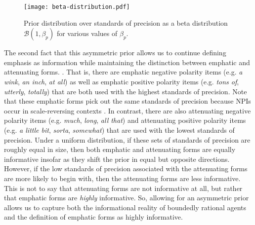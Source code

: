 \documentclass[linguex]{sp}
\theoremstyle{definition} \newtheorem{definition}{Definition}
\begin{document}
\begin{figure}
\begin{center}
	\texttt{[image: beta-distribution.pdf]}
	\caption{Prior distribution over standards of precision as a beta distribution $\mathcal{B}(1, \beta_p)$ for various values of $\beta_p$.}
	\label{beta}
\end{center}
\end{figure}


The second fact that this asymmetric prior allows us to continue defining emphasis as information while maintaining the distinction between emphatic and attenuating forms.  \citep{israel2011}. That is, there are emphatic negative polarity items (e.g. \emph{a wink}, \emph{an inch}, \emph{at all}) as well as emphatic positive polarity items (e.g. \emph{tons of}, \emph{utterly}, \emph{totally}) that are both used with the highest standards of precision. Note that these emphatic forms pick out the same standards of precision because NPIs occur in scale-reversing contexts \citep{fauconnier1975}. In contrast, there are also attenuating negative polarity items (e.g. \emph{much}, \emph{long}, \emph{all that}) and attenuating positive polarity items (e.g. \emph{a little bit}, \emph{sorta}, \emph{somewhat}) that are used with the lowest standards of precision. Under a uniform distribution, if these sets of standards of precision are roughly equal in size, then both emphatic and attenuating forms are equally informative insofar as they shift the prior in equal but opposite directions. However, if the low standards of precision associated with the attenuating forms are more likely to begin with, then the attenuating forms are less informative. This is not to say that attenuating forms are not informative at all, but rather that emphatic forms are \emph{highly} informative.  So, allowing for an asymmetric prior allows us to capture both the informational reality of boundedly rational agents and the definition of emphatic forms as highly informative.


\end{document}
